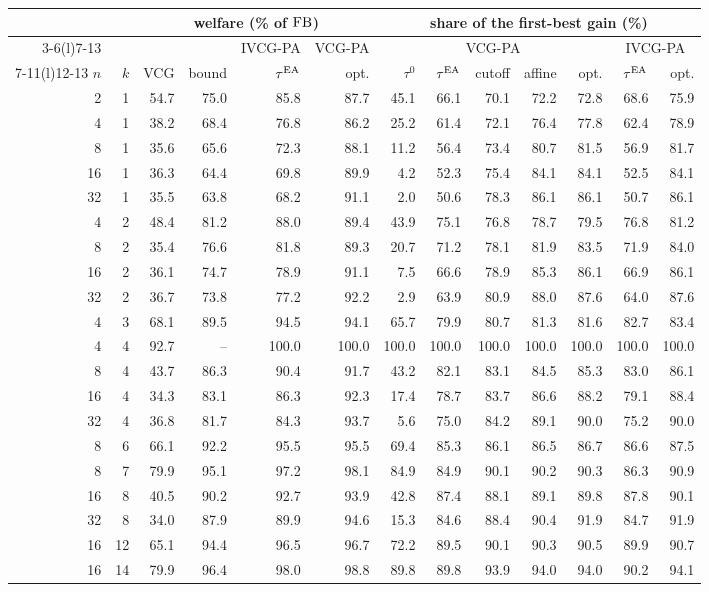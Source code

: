 \begin{tabular}{@{}rrrrrrrrrrrrr@{}}
\toprule
 & & \multicolumn{4}{c}{welfare (\% of $\mathrm{FB}$)} & \multicolumn{7}{c}{share of the first-best gain (\%)}\\
\cmidrule(lr){3-6}\cmidrule(l){7-13}
 & & & & IVCG-PA & VCG-PA & \multicolumn{5}{c}{VCG-PA} & \multicolumn{2}{c}{IVCG-PA}\\
\cmidrule(lr){7-11}\cmidrule(l){12-13}
$n$ & $k$ & VCG & bound & $\tau^{\mathrm{EA}}$ & opt. & $\tau^0$ & $\tau^{\mathrm{EA}}$ & cutoff & affine & opt. & $\tau^{\mathrm{EA}}$ & opt.\\
\midrule
2 & 1 & 54.7 & 75.0 & 85.8 & 87.7 & 45.1 & 66.1 & 70.1 & 72.2 & 72.8 & 68.6 & 75.9 \\
4 & 1 & 38.2 & 68.4 & 76.8 & 86.2 & 25.2 & 61.4 & 72.1 & 76.4 & 77.8 & 62.4 & 78.9 \\
8 & 1 & 35.6 & 65.6 & 72.3 & 88.1 & 11.2 & 56.4 & 73.4 & 80.7 & 81.5 & 56.9 & 81.7 \\
16 & 1 & 36.3 & 64.4 & 69.8 & 89.9 & 4.2 & 52.3 & 75.4 & 84.1 & 84.1 & 52.5 & 84.1 \\
32 & 1 & 35.5 & 63.8 & 68.2 & 91.1 & 2.0 & 50.6 & 78.3 & 86.1 & 86.1 & 50.7 & 86.1 \\
4 & 2 & 48.4 & 81.2 & 88.0 & 89.4 & 43.9 & 75.1 & 76.8 & 78.7 & 79.5 & 76.8 & 81.2 \\
8 & 2 & 35.4 & 76.6 & 81.8 & 89.3 & 20.7 & 71.2 & 78.1 & 81.9 & 83.5 & 71.9 & 84.0 \\
16 & 2 & 36.1 & 74.7 & 78.9 & 91.1 & 7.5 & 66.6 & 78.9 & 85.3 & 86.1 & 66.9 & 86.1 \\
32 & 2 & 36.7 & 73.8 & 77.2 & 92.2 & 2.9 & 63.9 & 80.9 & 88.0 & 87.6 & 64.0 & 87.6 \\
4 & 3 & 68.1 & 89.5 & 94.5 & 94.1 & 65.7 & 79.9 & 80.7 & 81.3 & 81.6 & 82.7 & 83.4 \\
4 & 4 & 92.7 & -- & 100.0 & 100.0 & 100.0 & 100.0 & 100.0 & 100.0 & 100.0 & 100.0 & 100.0 \\
8 & 4 & 43.7 & 86.3 & 90.4 & 91.7 & 43.2 & 82.1 & 83.1 & 84.5 & 85.3 & 83.0 & 86.1 \\
16 & 4 & 34.3 & 83.1 & 86.3 & 92.3 & 17.4 & 78.7 & 83.7 & 86.6 & 88.2 & 79.1 & 88.4 \\
32 & 4 & 36.8 & 81.7 & 84.3 & 93.7 & 5.6 & 75.0 & 84.2 & 89.1 & 90.0 & 75.2 & 90.0 \\
8 & 6 & 66.1 & 92.2 & 95.5 & 95.5 & 69.4 & 85.3 & 86.1 & 86.5 & 86.7 & 86.6 & 87.5 \\
8 & 7 & 79.9 & 95.1 & 97.2 & 98.1 & 84.9 & 84.9 & 90.1 & 90.2 & 90.3 & 86.3 & 90.9 \\
16 & 8 & 40.5 & 90.2 & 92.7 & 93.9 & 42.8 & 87.4 & 88.1 & 89.1 & 89.8 & 87.8 & 90.1 \\
32 & 8 & 34.0 & 87.9 & 89.9 & 94.6 & 15.3 & 84.6 & 88.4 & 90.4 & 91.9 & 84.7 & 91.9 \\
16 & 12 & 65.1 & 94.4 & 96.5 & 96.7 & 72.2 & 89.5 & 90.1 & 90.3 & 90.5 & 89.9 & 90.7 \\
16 & 14 & 79.9 & 96.4 & 98.0 & 98.8 & 89.8 & 89.8 & 93.9 & 94.0 & 94.0 & 90.2 & 94.1 \\
\bottomrule
\end{tabular}
